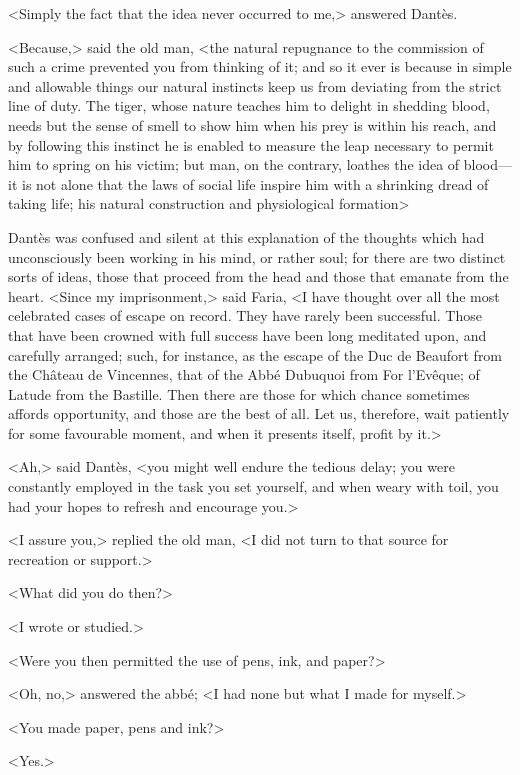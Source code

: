  <Simply the fact that the idea never occurred to me,> answered Dantès. 

 <Because,> said the old man, <the natural repugnance to the commission of such a crime prevented you from thinking of it; and so it ever is because in simple and allowable things our natural instincts keep us from deviating from the strict line of duty. The tiger, whose nature teaches him to delight in shedding blood, needs but the sense of smell to show him when his prey is within his reach, and by following this instinct he is enabled to measure the leap necessary to permit him to spring on his victim; but man, on the contrary, loathes the idea of blood—it is not alone that the laws of social life inspire him with a shrinking dread of taking life; his natural construction and physiological formation\longdash> 

 Dantès was confused and silent at this explanation of the thoughts which had unconsciously been working in his mind, or rather soul; for there are two distinct sorts of ideas, those that proceed from the head and those that emanate from the heart.  <Since my imprisonment,> said Faria, <I have thought over all the most celebrated cases of escape on record. They have rarely been successful. Those that have been crowned with full success have been long meditated upon, and carefully arranged; such, for instance, as the escape of the Duc de Beaufort from the Château de Vincennes, that of the Abbé Dubuquoi from For l'Evêque; of Latude from the Bastille. Then there are those for which chance sometimes affords opportunity, and those are the best of all. Let us, therefore, wait patiently for some favourable moment, and when it presents itself, profit by it.> 

 <Ah,> said Dantès, <you might well endure the tedious delay; you were constantly employed in the task you set yourself, and when weary with toil, you had your hopes to refresh and encourage you.> 

 <I assure you,> replied the old man, <I did not turn to that source for recreation or support.> 

 <What did you do then?> 

 <I wrote or studied.> 

 <Were you then permitted the use of pens, ink, and paper?> 

 <Oh, no,> answered the abbé; <I had none but what I made for myself.> 

 <You made paper, pens and ink?> 

 <Yes.> 


